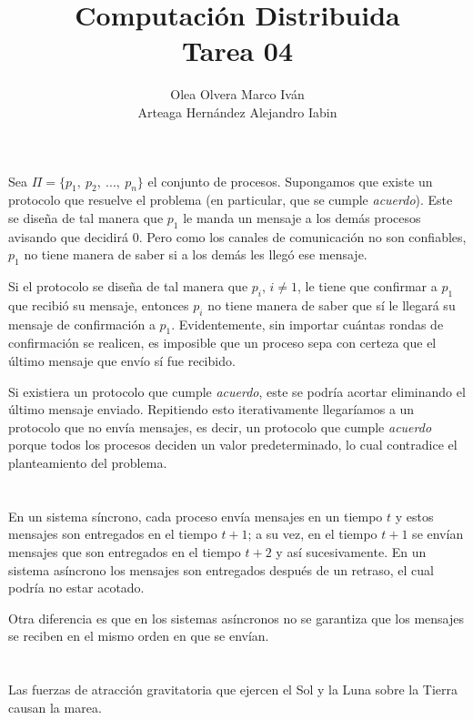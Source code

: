 \documentclass{article}
\title{Computación Distribuida \\ Tarea 04}
\author{Olea Olvera Marco Iván \\ Arteaga Hernández Alejandro Iabin}
\date{}
\begin{document}
\maketitle

\section{}

\section{}

Sea $\Pi = \{p_1,\ p_2,\ ...,\ p_n\}$ el conjunto de procesos. Supongamos que existe un protocolo que resuelve el problema (en particular, que se cumple \textit{acuerdo}). Este se diseña de tal manera que $p_1$ le manda un mensaje a los demás procesos avisando que decidirá 0. Pero como los canales de comunicación no son confiables, $p_1$ no tiene manera de saber si a los demás les llegó ese mensaje.

Si el protocolo se diseña de tal manera que $p_i$, $i \not= 1$, le tiene que confirmar a $p_1$ que recibió su mensaje, entonces $p_i$ no tiene manera de saber que sí le llegará su mensaje de confirmación a $p_1$. Evidentemente, sin importar cuántas rondas de confirmación se realicen, es imposible que un proceso sepa con certeza que el último mensaje que envío sí fue recibido.

Si existiera un protocolo que cumple \textit{acuerdo}, este se podría acortar eliminando el último mensaje enviado. Repitiendo esto iterativamente llegaríamos a un protocolo que no envía mensajes, es decir, un protocolo que cumple \textit{acuerdo} porque todos los procesos deciden un valor predeterminado, lo cual contradice el planteamiento del problema.

\section{}

En un sistema síncrono, cada proceso envía mensajes en un tiempo $t$ y estos mensajes son entregados en el tiempo $t+1$; a su vez, en el tiempo $t+1$ se envían mensajes que son entregados en el tiempo $t+2$ y así sucesivamente. En un sistema asíncrono los mensajes son entregados después de un retraso, el cual podría no estar acotado.

Otra diferencia es que en los sistemas asíncronos no se garantiza que los mensajes se reciben en el mismo orden en que se envían.

\section{}

\section{}

Las fuerzas de atracción gravitatoria que ejercen el Sol y la Luna sobre la Tierra causan la marea. \\ \\
\end{document}
